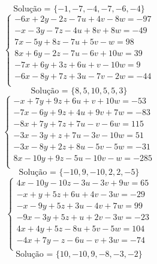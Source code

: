 \documentclass[12pt,oneside,a4paper]{article}
\begin{document}
\begin{equation*}
\text{Solução = }\{-1,-7,-4,-7,-6,-4\}
\end{equation*}
\vspace{\baselineskip}
\begin{equation*}
\begin{cases}
-6x+2y-2z-7u+4v-8w=-97 \\
-x-3y-7z-4u+8v+8w=-49 \\
7x-5y+8z-7u+5v-w=98 \\
8x+6y-2z-7u-6v+10w=39 \\
-7x+6y+3z+6u+v-10w=9 \\
-6x-8y+7z+3u-7v-2w=-44 \\
\end{cases}
\end{equation*}
\begin{equation*}
\text{Solução = }\{8,5,10,5,5,3\}
\end{equation*}
\vspace{\baselineskip}
\begin{equation*}
\begin{cases}
-x+7y+9z+6u+v+10w=-53 \\
-7x-6y+9z+4u+9v+7w=-83 \\
-8x+7y+7z+7u-v-6w=115 \\
-3x-3y+z+7u-3v-10w=51 \\
-3x-8y+2z+8u-5v-5w=-31 \\
8x-10y+9z-5u-10v-w=-285 \\
\end{cases}
\end{equation*}
\begin{equation*}
\text{Solução = }\{-10,9,-10,2,2,-5\}
\end{equation*}
\vspace{\baselineskip}
\begin{equation*}
\begin{cases}
4x-10y-10z-3u-3v+9w=65 \\
-x+y+5z+6u+4v-3w=-29 \\
-x-9y+5z+3u-4v+7w=99 \\
-9x-3y+5z+u+2v-3w=-23 \\
4x+4y+5z-8u+5v-5w=104 \\
-4x+7y-z-6u-v+3w=-74 \\
\end{cases}
\end{equation*}
\begin{equation*}
\text{Solução = }\{10,-10,9,-8,-3,-2\}
\end{equation*}
\end{document}
